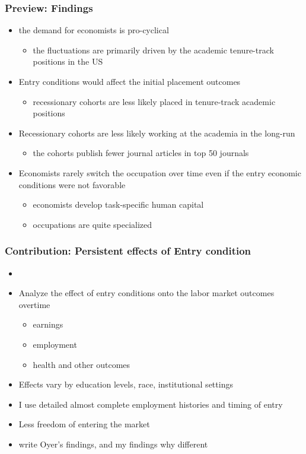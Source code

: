 \documentclass[11pt]{beamer}
\begin{document}
\begin{frame}
	\frametitle{Preview: Findings}
	\begin{itemize}
			\item the demand for economists is pro-cyclical
			\begin{itemize}
				\item the fluctuations are primarily driven by the academic tenure-track positions in the US
			\end{itemize}
			\vspace{1mm}
			\item Entry conditions would affect the initial placement outcomes
			\begin{itemize}
				\item  recessionary cohorts are less likely placed in tenure-track academic positions
			\end{itemize}
			\vspace{1mm}
			\item Recessionary cohorts are less likely working at the academia in the long-run
			\begin{itemize}
				\item the cohorts publish fewer journal articles in top 50 journals
			\end{itemize}
			\vspace{1mm}
			\item Economists rarely switch the occupation over time even if the entry economic conditions were not favorable
			\begin{itemize}
				\item economists develop task-specific human capital
				\item occupations are quite specialized
			\end{itemize}
	\end{itemize}
\end{frame}




\begin{frame}
	\frametitle{Contribution: Persistent effects of Entry condition} 
	\begin{itemize}
		\item {\color{red}{rewriting!}}
		\item Analyze the effect of entry conditions onto the labor market outcomes overtime
		\begin{itemize}
			\item earnings
			\item employment 
			\item health and other outcomes
		\end{itemize}
		\item Effects vary by education levels, race, institutional settings 

		\item I use detailed almost complete employment histories and timing of entry
		\item Less freedom of entering the market
		
		\item write Oyer's findings, and my findings why different
	\end{itemize}
\end{frame}
\end{document}
